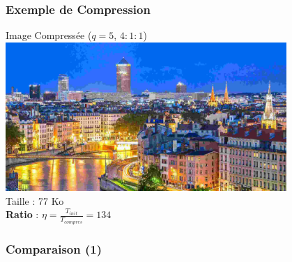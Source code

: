 \documentclass{beamer}
\begin{document}
\begin{frame}
    \frametitle{Exemple de Compression}

    \centering
    Image Compressée ($q = 5$, $4:1:1$) \\
    \includegraphics[width = 0.8\textwidth]{img/villeLyonLow.jpg} \\
    Taille : 77 Ko \\
    \textbf{Ratio} : $\eta = \frac{T_{init}}{T_{compres}} = 134$

\end{frame}

\begin{frame}
    \frametitle{Comparaison (1)}

    

\end{frame}
\end{document}
